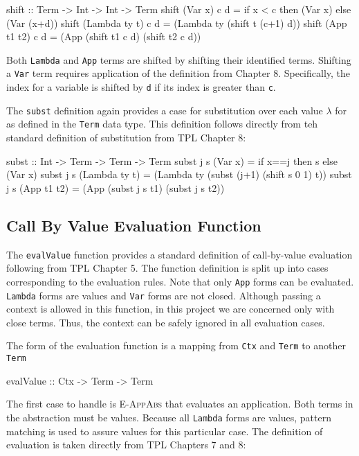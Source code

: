 \documentclass[10pt]{article}
\begin{document}
\begin{code}
  shift :: Term -> Int -> Int -> Term
  shift (Var x) c d = if x < c then (Var x) else (Var (x+d))
  shift (Lambda ty t) c d = (Lambda ty (shift t (c+1) d))
  shift (App t1 t2) c d = (App (shift t1 c d) (shift t2 c d))
\end{code}

Both \texttt{Lambda} and \texttt{App} terms are shifted by shifting
their identified terms.  Shifting a \texttt{Var} term requires
application of the definition from Chapter 8.  Specifically, the index
for a variable is shifted by \texttt{d} if its index is greater than
\texttt{c}.

The \texttt{subst} definition again provides a case for substitution
over each value $\lambda$ for as defined in the \texttt{Term} data
type.  This definition follows directly from teh standard definition
of substitution from TPL Chapter 8:

\begin{code}
  subst :: Int -> Term -> Term -> Term
  subst j s (Var x) = if x==j then s else (Var x)
  subst j s (Lambda ty t) = (Lambda ty (subst (j+1) (shift s 0 1) t))
  subst j s (App t1 t2) = (App (subst j s t1) (subst j s t2))
\end{code}

\subsection{Call By Value Evaluation Function}

The \texttt{evalValue} function provides a standard definition of
call-by-value evaluation following from TPL Chapter 5.  The function
definition is split up into cases corresponding to the evaluation
rules.  Note that only \texttt{App} forms can be evaluated.
\texttt{Lambda} forms are values and \texttt{Var} forms are not
closed.  Although passing a context is allowed in this function, in
this project we are concerned only with close terms.  Thus, the
context can be safely ignored in all evaluation cases.

The form of the evaluation function is a mapping from \texttt{Ctx} and
\texttt{Term} to another \texttt{Term}

\begin{code}
  evalValue :: Ctx -> Term -> Term
\end{code}

The first case to handle is \textsc{E-AppAbs} that evaluates an
application.  Both terms in the abstraction must be values.  Because
all \texttt{Lambda} forms are values, pattern matching is used to
assure values for this particular case.  The definition of evaluation
is taken directly from TPL Chapters 7 and 8:
\end{document}
